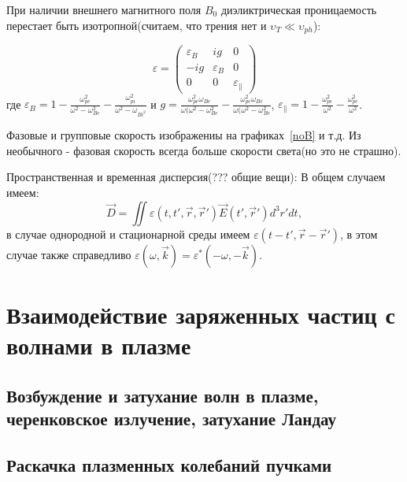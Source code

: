 \documentclass[10pt, a4paper]{article}
\numberwithin{equation}{section}
\begin{document}
При наличии внешнего магнитного поля $B_0$ диэликтрическая проницаемость перестает быть изотропной(считаем, что трения нет и $\upsilon_T \ll \upsilon_{ph}$):

\begin{equation}
    \label{eq.7.8}
    \varepsilon=
    \begin{pmatrix}
        \varepsilon_B & ig & 0 \\
        -ig & \varepsilon_B & 0 \\
        0 & 0 & \varepsilon_{\parallel}
    \end{pmatrix}
\end{equation}
 где $\varepsilon_B=1-\frac{\omega_{pe}^2}{\omega^2-\omega_{Be}^2}-\frac{\omega_{pi}^2}{\omega^2-\omega_{Bi^2}}$ и $g=\frac{\omega_{pe}^2 \omega_{Be}}{\omega (\omega^2-\omega_{Be}^2} -\frac{\omega_{pe}^2 \omega_{Be}}{\omega (\omega^2-\omega_{Be}^2}$, $\varepsilon_{\parallel}=1-\frac{\omega_{pe}^2}{\omega^2}-\frac{\omega_{pe}^2}{\omega^2}$. 

Фазовые и групповые скорость изображениы на графиках~\ref{noB} и т.д. Из необычного - фазовая скорость всегда больше скорости света(но это не страшно). 

Пространственная и временная дисперсия(??? общие вещи):
В общем случаем имеем:
\begin{equation}
    \label{eq.7.8}
    \overrightarrow{D}=\iint \varepsilon(t,t',\overrightarrow{r},\overrightarrow{r}') \overrightarrow{E}(t',\overrightarrow{r}') d^3 r' dt,
\end{equation}
в случае однородной и стационарной среды имеем $\varepsilon(t-t', \overrightarrow{r}-\overrightarrow{r}')$, в этом случае
также справедливо $\varepsilon(\omega, \overrightarrow{k})= \varepsilon^*(-\omega, -\overrightarrow{k})$.

\section{Взаимодействие заряженных частиц с волнами в плазме}

\subsection{Возбуждение и затухание волн в плазме, черенковское излучение, затухание Ландау}

\subsection{Раскачка плазменных колебаний пучками}
\end{document}
